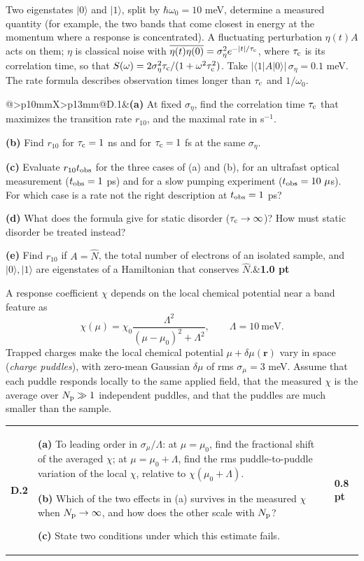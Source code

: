 \documentclass[11pt,a4paper]{article}
\makeatletter
\newcommand{\ket}[1]{\lvert #1\rangle}
\newcommand{\avg}[1]{\overline{#1}}
\newcommand{\parttitle}[3]{\par\Needspace{8\baselineskip}\vspace{6pt}{\large\bfseries\color{ink}Part #1. #2\hfill\normalsize(#3 points)}\par\vspace{2pt}}
\newcommand{\question}[3]{\begin{tcolorbox}[enhanced,colback=white,colframe=rulegray,boxrule=0.5pt,arc=0pt,left=7pt,right=7pt,top=7pt,bottom=7pt,before skip=9pt,after skip=9pt]\begin{tabularx}{\linewidth}{@{}>{\bfseries}p{10mm}X>{\raggedleft\arraybackslash}p{13mm}@{}}#1&#3&\textbf{#2 pt}\end{tabularx}\end{tcolorbox}}
\makeatother
\begin{document}
\parttitle{D}{Which random term first?}{2.2}
Two eigenstates $\ket0$ and $\ket1$, split by $\hbar\omega_0=10$ meV, determine a measured quantity (for example, the two bands that come closest in energy at the momentum where a response is concentrated). A fluctuating perturbation $\eta(t)A$ acts on them; $\eta$ is classical noise with $\avg{\eta(t)\eta(0)}=\sigma_\eta^2e^{-|t|/\tau_{\rm c}}$, where $\tau_{\rm c}$ is its correlation time, so that $S(\omega)=2\sigma_\eta^2\tau_{\rm c}/(1+\omega^2\tau_{\rm c}^2)$. Take $|\langle1|A|0\rangle|\,\sigma_\eta=0.1$ meV. The rate formula describes observation times longer than $\tau_{\rm c}$ and $1/\omega_0$.

\question{D.1}{1.0}{\textbf{(a)} At fixed $\sigma_\eta$, find the correlation time $\tau_{\rm c}$ that maximizes the transition rate $r_{10}$, and the maximal rate in s$^{-1}$.\par
\textbf{(b)} Find $r_{10}$ for $\tau_{\rm c}=1$ ns and for $\tau_{\rm c}=1$ fs at the same $\sigma_\eta$.\par
\textbf{(c)} Evaluate $r_{10}t_{\rm obs}$ for the three cases of (a) and (b), for an ultrafast optical measurement ($t_{\rm obs}=1$ ps) and for a slow pumping experiment ($t_{\rm obs}=10\ \mu$s). For which case is a rate not the right description at $t_{\rm obs}=1$ ps?\par
\textbf{(d)} What does the formula give for static disorder ($\tau_{\rm c}\to\infty$)? How must static disorder be treated instead?\par
\textbf{(e)} Find $r_{10}$ if $A=\hat N$, the total number of electrons of an isolated sample, and $\ket0,\ket1$ are eigenstates of a Hamiltonian that conserves $\hat N$.}

A response coefficient $\chi$ depends on the local chemical potential near a band feature as
\[
\chi(\mu)=\chi_0\frac{\Lambda^2}{(\mu-\mu_0)^2+\Lambda^2},\qquad \Lambda=10\ \text{meV}.
\]
Trapped charges make the local chemical potential $\mu+\delta\mu(\bm r)$ vary in space (\emph{charge puddles}), with zero-mean Gaussian $\delta\mu$ of rms $\sigma_\mu=3$ meV. Assume that each puddle responds locally to the same applied field, that the measured $\chi$ is the average over $N_{\rm p}\gg1$ independent puddles, and that the puddles are much smaller than the sample.

\question{D.2}{0.8}{\textbf{(a)} To leading order in $\sigma_\mu/\Lambda$: at $\mu=\mu_0$, find the fractional shift of the averaged $\chi$; at $\mu=\mu_0+\Lambda$, find the rms puddle-to-puddle variation of the local $\chi$, relative to $\chi(\mu_0+\Lambda)$.\par
\textbf{(b)} Which of the two effects in (a) survives in the measured $\chi$ when $N_{\rm p}\to\infty$, and how does the other scale with $N_{\rm p}$?\par
\textbf{(c)} State two conditions under which this estimate fails.}
\end{document}
